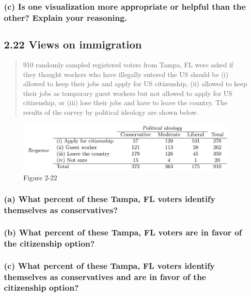 \documentclass[
]{article}
\begin{document}
\subsubsection{(c) Is one visualization more appropriate or helpful than
the other? Explain your
reasoning.}\label{c-is-one-visualization-more-appropriate-or-helpful-than-the-other-explain-your-reasoning.}

\subsection{2.22 Views on immigration}\label{views-on-immigration}

\begin{quote}
910 randomly sampled registered voters from Tampa, FL were asked if they
thought workers who have illegally entered the US should be (i) allowed
to keep their jobs and apply for US citizenship, (ii) allowed to keep
their jobs as temporary guest workers but not allowed to apply for US
citizenship, or (iii) lose their jobs and have to leave the country. The
results of the survey by political ideology are shown below.
\end{quote}

\begin{figure}
\centering
\includegraphics{./assets/2-22.jpg}
\caption{Figure 2-22}
\end{figure}

\subsubsection{(a) What percent of these Tampa, FL voters identify
themselves as
conservatives?}\label{a-what-percent-of-these-tampa-fl-voters-identify-themselves-as-conservatives}

\subsubsection{(b) What percent of these Tampa, FL voters are in favor
of the citizenship
option?}\label{b-what-percent-of-these-tampa-fl-voters-are-in-favor-of-the-citizenship-option}

\subsubsection{(c) What percent of these Tampa, FL voters identify
themselves as conservatives and are in favor of the citizenship
option?}\label{c-what-percent-of-these-tampa-fl-voters-identify-themselves-as-conservatives-and-are-in-favor-of-the-citizenship-option}
\end{document}
